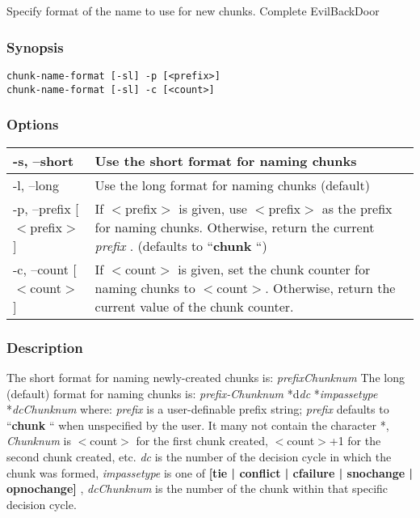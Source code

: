 \subsection{}
\label{chunk-name-format}
Specify format of the name to use for new chunks. 
 Complete EvilBackDoor
\subsubsection*{Synopsis}
\begin{verbatim}
chunk-name-format [-sl] -p [<prefix>]
chunk-name-format [-sl] -c [<count>]
\end{verbatim}
\subsubsection*{Options}
\begin{tabular}{|l|l|}
\hline 
 -s, --short  & Use the short format for naming chunks  \\
 \hline 
 -l, --long  & Use the long format for naming chunks (default)  \\
 \hline 
 -p, --prefix [$<$prefix$>$]  & If $<$prefix$>$ is given, use $<$prefix$>$ as the prefix for naming chunks. Otherwise, return the current \emph{prefix}
. (defaults to ``\textbf{chunk}
``)  \\
 \hline 
 -c, --count [$<$count$>$]  & If $<$count$>$ is given, set the chunk counter for naming chunks to $<$count$>$. Otherwise, return the current value of the chunk counter.  \\
 \hline 
\end{tabular}
\subsubsection*{Description}
 The short format for naming newly-created chunks is: 
 \emph{prefixChunknum}
 The long (default) format for naming chunks is: 
 \emph{prefix-Chunknum}
*d\emph{dc}
*\emph{impassetype}
*\emph{dcChunknum}
 where: 
 \emph{prefix}
 is a user-definable prefix string; \emph{prefix}
 defaults to ``\textbf{chunk}
`` when unspecified by the user. It many not contain the character *, 
 \emph{Chunknum}
 is $<$count$>$ for the first chunk created, $<$count$>$+1 for the second chunk created, etc. 
 \emph{dc}
 is the number of the decision cycle in which the chunk was formed, 
 \emph{impassetype}
 is one of \textbf{[tie | conflict | cfailure | snochange | opnochange]}
, 
 \emph{dcChunknum}
 is the number of the chunk within that specific decision cycle. 
